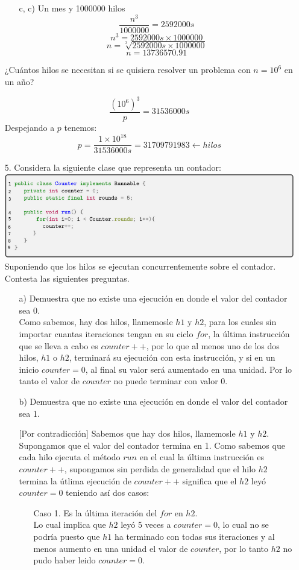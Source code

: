 \documentclass[12pt, letterpaper]{article}
\begin{document}
\begin{itemize}
\begin{itemize}
\item[c, c) ] Un mes y 1000000 hilos
$$\frac{n^3}{1000000} = 2592000s$$
$$n^3 = 2592000s \times 1000000$$
$$n = \sqrt[3]{2592000s \times 1000000}$$
$$n = 13736570.91$$
\end{itemize}
¿Cuántos hilos se necesitan si se quisiera resolver un problema con $n = 10^6$ en un año? 

$$\frac{(10^6)^3}{p} = 31536000s$$
Despejando a $p$ tenemos:
$$p = \frac{1\times 10^{18}}{31536000s} = 31709791983\leftarrow hilos$$


\item[5. ] Considera la siguiente clase que representa un contador:\\
\includegraphics[width=\textwidth]{Codigo5}\\
Suponiendo que los hilos se ejecutan concurrentemente sobre el contador. Contesta las siguientes preguntas.
\begin{itemize}
\item[a) ] Demuestra que no existe una ejecución en donde el valor del contador sea 0.\\

Como sabemos, hay dos hilos, llamemosle $h1$ y $h2$, para los cuales sin importar cuantas iteraciones tengan en su ciclo $for$, la última instrucción que se lleva a cabo es $counter++$, por lo que al menos uno de los dos hilos, $h1$ o $h2$, terminará su ejecución con esta instrucción, y si en un inicio $counter = 0$, al final su valor será aumentado en una unidad. Por lo tanto el valor de $counter$ no puede terminar con valor 0. 

\item[b) ] Demuestra que no existe una ejecución en donde el valor del contador sea 1.

[Por contradicción] Sabemos que hay dos hilos, llamemosle $h1$ y $h2$. Supongamos que el valor del contador termina en 1. Como sabemos que cada hilo ejecuta el método $run$ en el cual la última instrucción es $counter++$, supongamos sin perdida de generalidad que el hilo $h2$ termina la útlima ejecución de $counter++$ significa que el $h2$ leyó $counter = 0$ teniendo así dos casos: 
\begin{itemize}
\item[Caso 1. ] Es la última iteración del $for$ en $h2$.\\
Lo cual implica que $h2$ leyó 5 veces a $counter = 0$, lo cual no se podría puesto que $h1$ ha terminado con todas sus iteraciones y al menos aumento en una unidad el valor de $counter$, por lo tanto $h2$ no pudo haber leido $counter = 0$.


\end{itemize}
\end{itemize}
\end{itemize}
\end{document}
